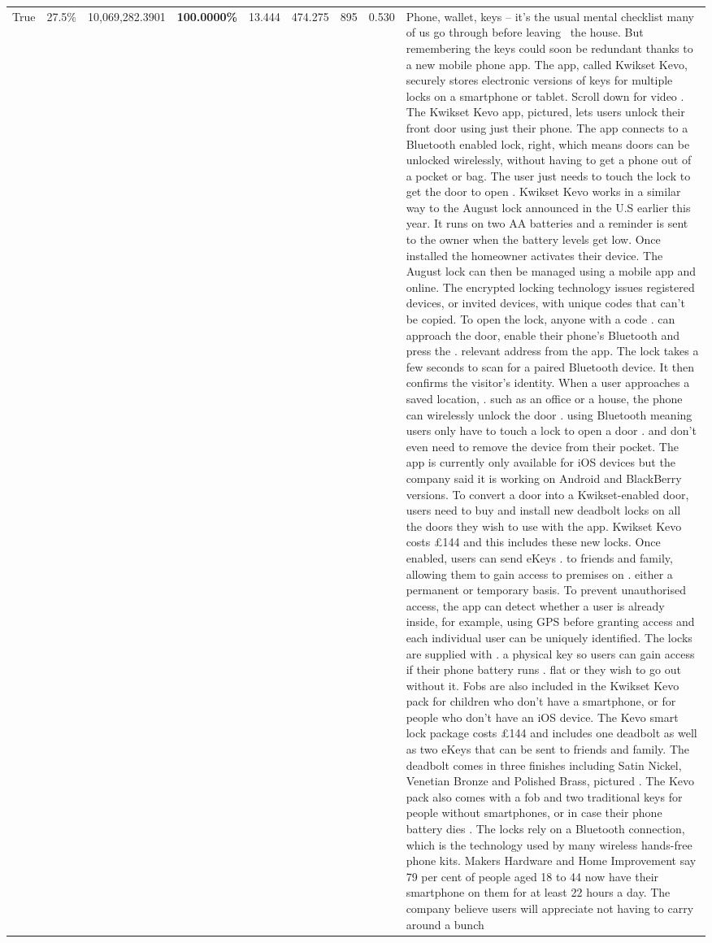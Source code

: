 \begin{table}[H]
\begin{tabular}{lllrlllll}
True & 27.5\% & 10,069,282.3901 & \bfseries \color{red} 100.0000\% & 13.444 & 474.275 & 895 & 0.530 & Phone, wallet, keys – it’s the usual mental checklist many of us go through before leaving  the house. But remembering the keys could soon be redundant thanks to a new mobile phone app. The app, called Kwikset Kevo, securely stores electronic versions of keys for multiple locks on a smartphone or tablet. Scroll down for video . The Kwikset Kevo app, pictured, lets users unlock their front door using just their phone. The app connects to a Bluetooth enabled lock, right, which means doors can be unlocked wirelessly, without having to get a phone out of a pocket or bag. The user just needs to touch the lock to get the door to open . Kwikset Kevo works in a similar way to the August lock announced in the U.S earlier this year. It runs on two AA batteries and a reminder is sent to the owner when the battery levels get low. Once installed the homeowner activates their device. The August lock can then be managed using a mobile app and online. The encrypted locking technology issues registered devices, or invited devices, with unique codes that can't be copied. To open the lock, anyone with a code . can approach the door, enable their phone's Bluetooth and press the . relevant address from the app. The lock takes a few seconds to scan for a paired Bluetooth device. It then confirms the visitor's identity. When a user approaches a saved location, . such as an office or a house, the phone can wirelessly unlock the door . using Bluetooth meaning users only have to touch a lock to open a door . and don't even need to remove the device from their pocket. The app is currently only available for iOS devices but the company said it is working on Android and BlackBerry versions. To convert a door into a Kwikset-enabled door, users need to buy and install new deadbolt locks on all the doors they wish to use with the app. Kwikset Kevo costs £144 and this includes these new locks. Once enabled, users can send eKeys . to friends and family, allowing them to gain access to premises on . either a permanent or temporary basis. To prevent unauthorised access, the app can detect whether a user is already inside, for example, using GPS before granting access and each individual user can be uniquely identified. The locks are supplied with . a physical key so users can gain access if their phone battery runs . flat or they wish to go out without it. Fobs are also included in the Kwikset Kevo pack for children who don't have a smartphone, or for people who don't have an iOS device. The Kevo smart lock package costs £144 and includes one deadbolt as well as two eKeys that can be sent to friends and family. The deadbolt comes in three finishes including Satin Nickel, Venetian Bronze and Polished Brass, pictured . The Kevo pack also comes with a fob and two traditional keys for people without smartphones, or in case their phone battery dies . The locks rely on a Bluetooth connection, which is the technology used by many wireless hands-free phone kits. Makers Hardware and Home Improvement say 79 per cent of people aged 18 to 44 now have their smartphone on them for at least 22 hours a day. The company believe users will appreciate not having to carry around a bunch 
\end{tabular}
\end{table}
